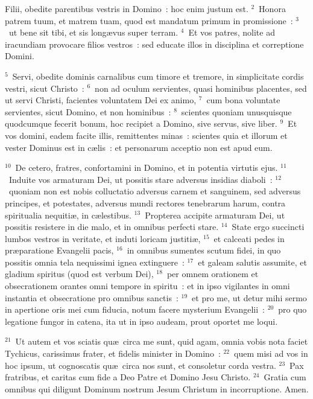 \lettrine[lines=3,image=true,loversize=0.05,lraise=-0.03]{F}{}ilii, obedite parentibus vestris in Domino~: hoc enim justum est.
${}^{2}$~Honora patrem tuum, et matrem tuam, quod est mandatum primum in promissione~:
${}^{3}$~ut bene sit tibi, et sis long\ae vus super terram.
${}^{4}$~Et vos patres, nolite ad iracundiam provocare filios vestros~: sed educate illos in disciplina et correptione Domini.


${}^{5}$~Servi, obedite dominis carnalibus cum timore et tremore, in simplicitate cordis vestri, sicut Christo~:
${}^{6}$~non ad oculum servientes, quasi hominibus placentes, sed ut servi Christi, facientes voluntatem Dei ex animo,
${}^{7}$~cum bona voluntate servientes, sicut Domino, et non hominibus~:
${}^{8}$~scientes quoniam unusquisque quodcumque fecerit bonum, hoc recipiet a Domino, sive servus, sive liber.
${}^{9}$~Et vos domini, eadem facite illis, remittentes minas~: scientes quia et illorum et vester Dominus est in c\ae lis~: et personarum acceptio non est apud eum.


${}^{10}$~De cetero, fratres, confortamini in Domino, et in potentia virtutis ejus.
${}^{11}$~Induite vos armaturam Dei, ut possitis stare adversus insidias diaboli~:
${}^{12}$~quoniam non est nobis colluctatio adversus carnem et sanguinem, sed adversus principes, et potestates, adversus mundi rectores tenebrarum harum, contra spiritualia nequiti\ae , in c\ae lestibus.
${}^{13}$~Propterea accipite armaturam Dei, ut possitis resistere in die malo, et in omnibus perfecti stare.
${}^{14}$~State ergo succincti lumbos vestros in veritate, et induti loricam justiti\ae ,
${}^{15}$~et calceati pedes in pr\ae paratione Evangelii pacis,
${}^{16}$~in omnibus sumentes scutum fidei, in quo possitis omnia tela nequissimi ignea extinguere~:
${}^{17}$~et galeam salutis assumite, et gladium spiritus (quod est verbum Dei),
${}^{18}$~per omnem orationem et obsecrationem orantes omni tempore in spiritu~: et in ipso vigilantes in omni instantia et obsecratione pro omnibus sanctis~:
${}^{19}$~et pro me, ut detur mihi sermo in apertione oris mei cum fiducia, notum facere mysterium Evangelii~:
${}^{20}$~pro quo legatione fungor in catena, ita ut in ipso audeam, prout oportet me loqui.


${}^{21}$~Ut autem et vos sciatis qu\ae\ circa me sunt, quid agam, omnia vobis nota faciet Tychicus, carissimus frater, et fidelis minister in Domino~:
${}^{22}$~quem misi ad vos in hoc ipsum, ut cognoscatis qu\ae\ circa nos sunt, et consoletur corda vestra.
${}^{23}$~Pax fratribus, et caritas cum fide a Deo Patre et Domino Jesu Christo.
${}^{24}$~Gratia cum omnibus qui diligunt Dominum nostrum Jesum Christum in incorruptione. Amen.
